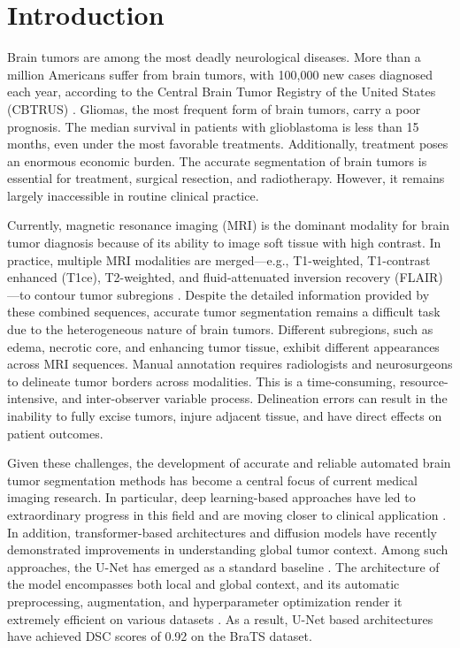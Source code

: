 \documentclass[11pt,letterpaper]{article}
\begin{document}
\newpage
\setcounter{page}{1}

\section{Introduction}
Brain tumors are among the most deadly neurological diseases. More than a million Americans suffer from brain tumors, with 100,000 new cases diagnosed each year, according to the Central Brain Tumor Registry of the United States (CBTRUS) \cite{BraTS2023}. Gliomas, the most frequent form of brain tumors, carry a poor prognosis. The median survival in patients with glioblastoma is less than 15 months, even under the most favorable treatments. Additionally, treatment poses an enormous economic burden. The accurate segmentation of brain tumors is essential for treatment, surgical resection, and radiotherapy. However, it remains largely inaccessible in routine clinical practice.

Currently, magnetic resonance imaging (MRI) is the dominant modality for brain tumor diagnosis because of its ability to image soft tissue with high contrast. In practice, multiple MRI modalities are merged—e.g., T1-weighted, T1-contrast enhanced (T1ce), T2-weighted, and fluid-attenuated inversion recovery (FLAIR)—to contour tumor subregions \cite{desikan2006}. Despite the detailed information provided by these combined sequences, accurate tumor segmentation remains a difficult task due to the heterogeneous nature of brain tumors. Different subregions, such as edema, necrotic core, and enhancing tumor tissue, exhibit different appearances across MRI sequences. Manual annotation requires radiologists and neurosurgeons to delineate tumor borders across modalities. This is a time-consuming, resource-intensive, and inter-observer variable process. Delineation errors can result in the inability to fully excise tumors, injure adjacent tissue, and have direct effects on patient outcomes.

Given these challenges, the development of accurate and reliable automated brain tumor segmentation methods has become a central focus of current medical imaging research. In particular, deep learning-based approaches have led to extraordinary progress in this field and are moving closer to clinical application \cite{fischl2012,shattuck2002}. In addition, transformer-based architectures and diffusion models have recently demonstrated improvements in understanding global tumor context. Among such approaches, the U-Net has emerged as a standard baseline \cite{ronneberger2015}. The architecture of the model encompasses both local and global context, and its automatic preprocessing, augmentation, and hyperparameter optimization render it extremely efficient on various datasets \cite{nnUnet}. As a result, U-Net based architectures have achieved DSC scores of 0.92 on the BraTS dataset.
\end{document}
